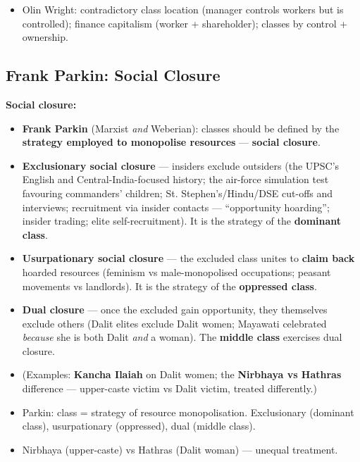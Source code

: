 \begin{QuickRevision}
\begin{itemize}
\item Olin Wright: contradictory class location (manager controls workers but is controlled); finance capitalism (worker + shareholder); classes by control + ownership.
\end{itemize}
\end{QuickRevision}

\sectiondivider

\subsection{Frank Parkin: Social Closure}

\begin{KeyConcept}
\textbf{Social closure:}
\begin{itemize}
\item \textbf{Frank Parkin} (Marxist \textit{and} Weberian): classes should be defined by the \textbf{strategy employed to monopolise resources} --- \textbf{social closure}.
\item \textbf{Exclusionary social closure} --- insiders exclude outsiders (the UPSC's English and Central-India-focused history; the air-force simulation test favouring commanders' children; St. Stephen's/Hindu/DSE cut-offs and interviews; recruitment via insider contacts --- ``opportunity hoarding''; insider trading; elite self-recruitment). It is the strategy of the \textbf{dominant class}.
\item \textbf{Usurpationary social closure} --- the excluded class unites to \textbf{claim back} hoarded resources (feminism vs male-monopolised occupations; peasant movements vs landlords). It is the strategy of the \textbf{oppressed class}.
\item \textbf{Dual closure} --- once the excluded gain opportunity, they themselves exclude others (Dalit elites exclude Dalit women; Mayawati celebrated \textit{because} she is both Dalit \textit{and} a woman). The \textbf{middle class} exercises dual closure.
\item (Examples: \textbf{Kancha Ilaiah} on Dalit women; the \textbf{Nirbhaya vs Hathras} difference --- upper-caste victim vs Dalit victim, treated differently.)
\end{itemize}
\end{KeyConcept}

\begin{QuickRevision}
\begin{itemize}
\item Parkin: class = strategy of resource monopolisation. Exclusionary (dominant class), usurpationary (oppressed), dual (middle class).
\item Nirbhaya (upper-caste) vs Hathras (Dalit woman) --- unequal treatment.
\end{itemize}
\end{QuickRevision}

